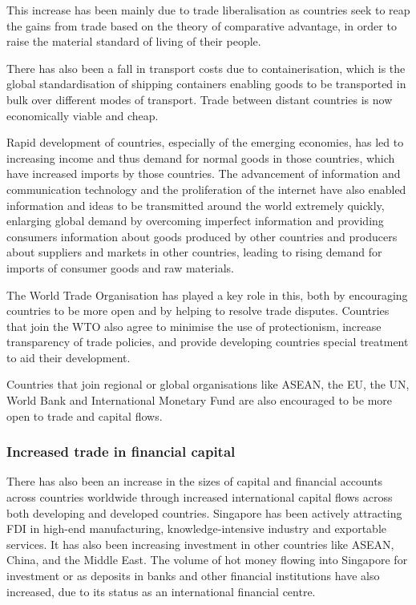 \documentclass[Economics.tex]{subfiles}
\begin{document}
This increase has been mainly due to trade liberalisation as countries seek to reap the gains from trade based on the theory of comparative advantage, in order to raise the material standard of living of their people.

There has also been a fall in transport costs due to containerisation, which is the global standardisation of shipping containers enabling goods to be transported in bulk over different modes of transport. Trade between distant countries is now economically viable and cheap.

Rapid development of countries, especially of the emerging economies, has led to increasing income and thus demand for normal goods in those countries, which have increased imports by those countries. The advancement of information and communication technology and the proliferation of the internet have also enabled information and ideas to be transmitted around the world extremely quickly, enlarging global demand by overcoming imperfect information and providing consumers information about goods produced by other countries and producers about suppliers and markets in other countries, leading to rising demand for imports of consumer goods and raw materials.

The World Trade Organisation has played a key role in this, both by encouraging countries to be more open and by helping to resolve trade disputes. Countries that join the WTO also agree to minimise the use of protectionism, increase transparency of trade policies, and provide developing countries special treatment to aid their development.

Countries that join regional or global organisations like ASEAN, the EU, the UN, World Bank and International Monetary Fund are also encouraged to be more open to trade and capital flows.
\subsubsection{Increased trade in financial capital}
There has also been an increase in the sizes of capital and financial accounts across countries worldwide through increased international capital flows across both developing and developed countries. Singapore has been actively attracting FDI in high-end manufacturing, knowledge-intensive industry and exportable services. It has also been increasing investment in other countries like ASEAN, China, and the Middle East. The volume of hot money flowing into Singapore for investment or as deposits in banks and other financial institutions have also increased, due to its status as an international financial centre.
\end{document}
